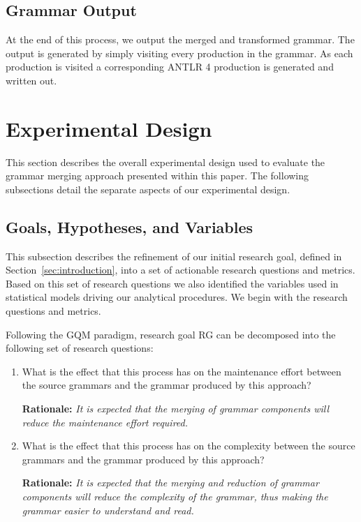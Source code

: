\documentclass[conference]{IEEEtran}
\begin{document}
\hypertarget{sec:grammar_output}{%
\subsection{Grammar Output}\label{sec:grammar_output}}

At the end of this process, we output the merged and transformed
grammar. The output is generated by simply visiting every production in
the grammar. As each production is visited a corresponding ANTLR 4
production is generated and written out.

\hypertarget{sec:experimental_design}{%
\section{Experimental Design}\label{sec:experimental_design}}

This section describes the overall experimental design used to evaluate
the grammar merging approach presented within this paper. The following
subsections detail the separate aspects of our experimental design.

\hypertarget{sec:exp_goals}{%
\subsection{Goals, Hypotheses, and Variables}\label{sec:exp_goals}}

This subsection describes the refinement of our initial research goal,
defined in Section~\ref{sec:introduction}, into a set of actionable
research questions and metrics. Based on this set of research questions
we also identified the variables used in statistical models driving our
analytical procedures. We begin with the research questions and metrics.

Following the GQM paradigm, research goal RG can be decomposed into the
following set of research questions:

\begin{enumerate}[label={\textbf{RQ\arabic*}},left=.2in]

\item What is the effect that this process has on the maintenance effort between the source grammars and the grammar produced by this approach?

 \textbf{Rationale:} \textit{It is expected that the merging of grammar components will reduce the maintenance effort required.}

 \item What is the effect that this process has on the complexity between the source grammars and the grammar produced by this approach?

 \textbf{Rationale:} \textit{It is expected that the merging and reduction of grammar components will reduce the complexity of the grammar, thus making the grammar easier to understand and read.}

\end{enumerate}
\end{document}
